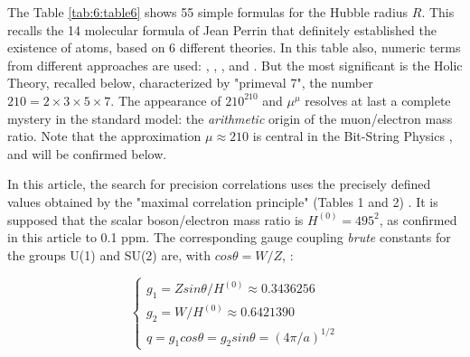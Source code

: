 \documentclass[a4paper,9pt]{article}
\begin{document}
The Table \ref{tab:6:table6} shows 55 simple formulas for the Hubble radius $R$. This recalls the 14 molecular formula of Jean Perrin that definitely established the existence of atoms, based on 6 different theories. In this table also, numeric terms from different approaches are used:  \cite{Davies}, \cite{Rees}, \cite{Eddington}, \cite{Bastin} and \cite{Atiyah}. But the most significant is the Holic Theory, recalled below, characterized by "primeval 7", the number $210 = 2 \times 3\times 5\times7$. The appearance of $210^{210}$ and $\mu^{\mu}$ resolves at last a complete mystery in the standard model: the \textit{arithmetic} origin of the muon/electron mass ratio. Note that the approximation $\mu \approx 210$ is central in the Bit-String Physics \cite{Noyes}, and will be confirmed below. 


In this article, the search for precision correlations uses the precisely defined values obtained by the "maximal correlation principle" (Tables 1 and 2) \cite{Sanchez3}. It is supposed that the scalar boson/electron mass ratio is $H^{(0)}=495^2$, as confirmed in this article to 0.1 ppm. The corresponding gauge coupling \textit{brute} constants for the groups U(1) and SU(2) are, with $cos \theta = W/Z$, : 

\begin{equation}\label{Eq3}
 \left\{
    \begin{array}{ll}
    g_1 = Zsin\theta /H^{(0)} \approx 0.3436256 \\
    g_2 = W/H^{(0)} \approx 0.6421390\\ 
    q = g_1 cos \theta = g_2 sin \theta = (4\pi/a)^{1/2}
    
    \end{array}
\right.
\end{equation}


\end{document}
